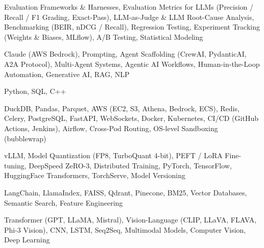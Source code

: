 \documentclass[letter,10pt]{article}
\begin{document}
 Evaluation Frameworks \& Harnesses, Evaluation Metrics for LLMs (Precision / Recall / F1 Grading, Exact-Pass), LLM-as-Judge \& LLM Root-Cause Analysis, Benchmarking (BEIR, nDCG / Recall), Regression Testing, Experiment Tracking (Weights \& Biases, MLflow), A/B Testing, Statistical Modeling\par\vspace{2pt}

 Claude (AWS Bedrock), Prompting, Agent Scaffolding (CrewAI, PydanticAI, A2A Protocol), Multi-Agent Systems, Agentic AI Workflows, Human-in-the-Loop Automation, Generative AI, RAG, NLP\par\vspace{2pt}

 Python, SQL, C++\par\vspace{2pt}

 DuckDB, Pandas, Parquet, AWS (EC2, S3, Athena, Bedrock, ECS), Redis, Celery, PostgreSQL, FastAPI, WebSockets, Docker, Kubernetes, CI/CD (GitHub Actions, Jenkins), Airflow, Cross-Pod Routing, OS-level Sandboxing (bubblewrap)\par\vspace{2pt}

 vLLM, Model Quantization (FP8, TurboQuant 4-bit), PEFT / LoRA Fine-tuning, DeepSpeed ZeRO-3, Distributed Training, PyTorch, TensorFlow, HuggingFace Transformers, TorchServe, Model Versioning\par\vspace{2pt}

 LangChain, LlamaIndex, FAISS, Qdrant, Pinecone, BM25, Vector Databases, Semantic Search, Feature Engineering\par\vspace{2pt}

 Transformer (GPT, LLaMA, Mistral), Vision-Language (CLIP, LLaVA, FLAVA, Phi-3 Vision), CNN, LSTM, Seq2Seq, Multimodal Models, Computer Vision, Deep Learning
\end{document}
